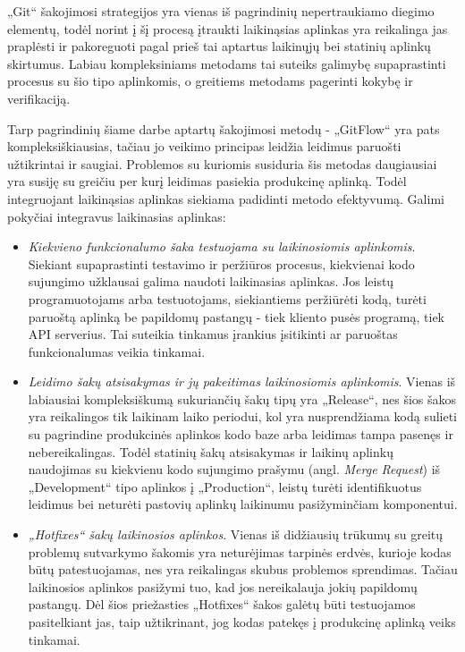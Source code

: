 \documentclass{VUMIFPSkursinis}
\begin{document}
„Git“ šakojimosi strategijos yra vienas iš pagrindinių nepertraukiamo diegimo elementų, todėl norint į šį procesą įtraukti laikinąsias aplinkas yra reikalinga jas praplėsti ir pakoreguoti pagal prieš tai aptartus laikinųjų bei statinių aplinkų skirtumus. Labiau kompleksiniams metodams tai suteiks galimybę supaprastinti procesus su šio tipo aplinkomis, o greitiems metodams pagerinti kokybę ir verifikaciją. 

Tarp pagrindinių šiame darbe aptartų šakojimosi metodų - „GitFlow“ yra pats kompleksiškiausias, tačiau jo veikimo principas leidžia leidimus paruošti užtikrintai ir saugiai. Problemos su kuriomis susiduria šis metodas daugiausiai yra susiję su greičiu per kurį leidimas pasiekia produkcinę aplinką. Todėl integruojant laikinąsias aplinkas siekiama padidinti metodo efektyvumą. Galimi pokyčiai integravus laikinasias aplinkas: 

\begin{itemize}
  \item \textit{Kiekvieno funkcionalumo šaka testuojama su laikinosiomis aplinkomis}. Siekiant supaprastinti testavimo ir peržiūros procesus, kiekvienai kodo sujungimo užklausai galima naudoti laikinasias aplinkas. Jos leistų programuotojams arba testuotojams, siekiantiems peržiūrėti kodą, turėti paruoštą aplinką be papildomų pastangų - tiek kliento pusės programą, tiek API serverius. Tai suteikia tinkamus įrankius įsitikinti ar paruoštas funkcionalumas veikia tinkamai.

  \item \textit{Leidimo šakų atsisakymas ir jų pakeitimas laikinosiomis aplinkomis}. Vienas iš labiausiai kompleksiškumą sukuriančių šakų tipų yra „Release“, nes šios šakos yra reikalingos tik laikinam laiko periodui, kol yra nusprendžiama kodą sulieti su pagrindine produkcinės aplinkos kodo baze arba leidimas tampa pasenęs ir nebereikalingas. Todėl statinių šakų atsisakymas ir laikinų aplinkų naudojimas su kiekvienu kodo sujungimo prašymu (angl. \textit{Merge Request}) iš „Development“ tipo aplinkos į „Production“, leistų turėti identifikuotus leidimus bei neturėti pastovių aplinkų laikinumu pasižyminčiam komponentui.
  
  \item \textit{„Hotfixes“ šakų laikinosios aplinkos}. Vienas iš didžiausių trūkumų su greitų problemų sutvarkymo šakomis yra neturėjimas tarpinės erdvės, kurioje kodas būtų patestuojamas, nes yra reikalingas skubus problemos sprendimas. Tačiau laikinosios aplinkos pasižymi tuo, kad jos nereikalauja jokių papildomų pastangų. Dėl šios priežasties „Hotfixes“ šakos galėtų būti testuojamos pasitelkiant jas, taip užtikrinant, jog kodas patekęs į produkcinę aplinką veiks tinkamai.

\end{itemize}
\end{document}

